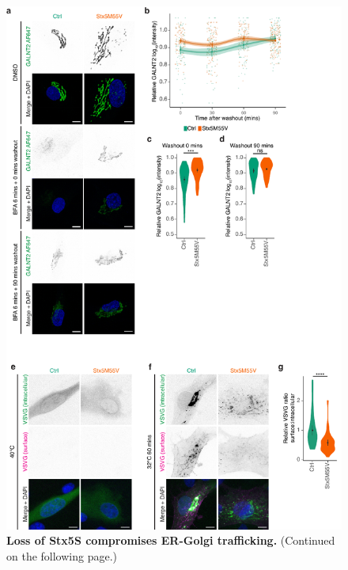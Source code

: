 \begin{figure}
    \includegraphics[keepaspectratio=true,width=\textwidth,height=\textheight]{chapters/chapter6/chapter6_Figure5.pdf}
    \caption{\textbf{Loss of Stx5S compromises ER-Golgi trafficking.} (Continued on the following page.)}
    \label{fig:ch6fig5}
\end{figure}

